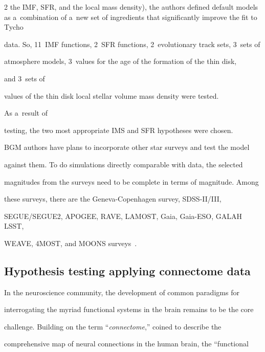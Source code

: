 \begin{multicols}{2}
the IMF, SFR, and the local mass density), the authors defined default models as a~combination of a~new set of ingredients that significantly improve the fit to Tycho


data.  So, 11~IMF functions, 2~SFR functions, 2~evolutionary track sets, 3~sets of


atmosphere models, 3~values for the age of the formation of the thin disk,


and 3~sets of


values of the thin disk local stellar volume mass density were tested.


As a~result of


testing, the two most appropriate IMS and SFR hypotheses were chosen.










  BGM authors have plans to incorporate other star surveys and test the model


against them. To do simulations directly comparable with data, the selected


magnitudes from the surveys need to be complete in terms of magnitude. Among


these surveys, there are the Geneva-Copenhagen survey, SDSS-II/III,


SEGUE/SEGUE2, APOGEE, RAVE, LAMOST, Gaia, Gaia-ESO, GALAH LSST,


WEAVE, 4MOST, and \mbox{MOONS} surveys~\cite{61-kl}.





\subsection{Hypothesis testing applying connectome data }





\noindent


  In the neuroscience community, the development of common paradigms for


interrogating the myriad functional systems in the brain remains to be the core


challenge. Building on the term ``\textit{connectome},'' coined to describe the


comprehensive map of neural connections in the human brain, the ``functional



\end{multicols}
